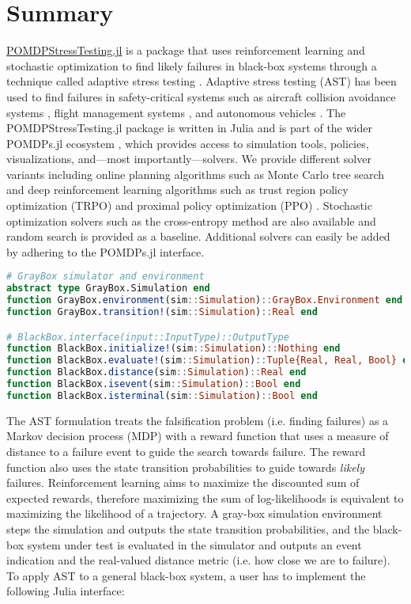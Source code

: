 \section{Summary}

\href{https://github.com/sisl/POMDPStressTesting.jl}{POMDPStressTesting.jl} is a package that uses reinforcement learning and stochastic optimization to find likely failures in black-box systems through a technique called adaptive stress testing \cite{ast}.
Adaptive stress testing (AST) has been used to find failures in safety-critical systems such as aircraft collision avoidance systems \cite{ast_acasx}, flight management systems \cite{ast_fms}, and autonomous vehicles \cite{ast_av}.
The POMDPStressTesting.jl package is written in Julia \cite{julia} and is part of the wider POMDPs.jl ecosystem \cite{pomdps_jl}, which provides access to simulation tools, policies, visualizations, and---most importantly---solvers.
We provide different solver variants including online planning algorithms such as Monte Carlo tree search \cite{mcts} and deep reinforcement learning algorithms such as trust region policy optimization (TRPO) \cite{trpo} and proximal policy optimization (PPO) \cite{ppo}.
Stochastic optimization solvers such as the cross-entropy method \cite{cem} are also available and random search is provided as a baseline.
Additional solvers can easily be added by adhering to the POMDPs.jl interface.

\begin{lstlisting}[language=Julia]
# GrayBox simulator and environment
abstract type GrayBox.Simulation end
function GrayBox.environment(sim::Simulation)::GrayBox.Environment end
function GrayBox.transition!(sim::Simulation)::Real end

# BlackBox.interface(input::InputType)::OutputType
function BlackBox.initialize!(sim::Simulation)::Nothing end
function BlackBox.evaluate!(sim::Simulation)::Tuple{Real, Real, Bool} end
function BlackBox.distance(sim::Simulation)::Real end
function BlackBox.isevent(sim::Simulation)::Bool end
function BlackBox.isterminal(sim::Simulation)::Bool end
\end{lstlisting}

The AST formulation treats the falsification problem (i.e. finding failures) as a Markov decision process (MDP) with a reward function that uses a measure of distance to a failure event to guide the search towards failure.
The reward function also uses the state transition probabilities to guide towards \textit{likely} failures.
Reinforcement learning aims to maximize the discounted sum of expected rewards, therefore maximizing the sum of log-likelihoods is equivalent to maximizing the likelihood of a trajectory.
A gray-box simulation environment steps the simulation and outputs the state transition probabilities, and the black-box system under test is evaluated in the simulator and outputs an event indication and the real-valued distance metric (i.e. how close we are to failure).
To apply AST to a general black-box system, a user has to implement the following Julia interface:

